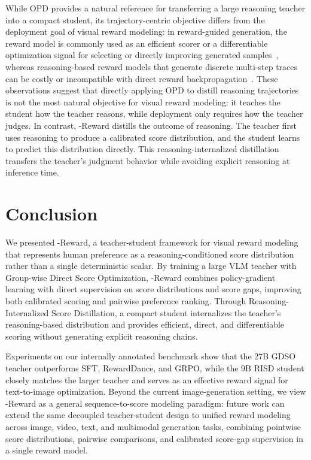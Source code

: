 \documentclass{llmxive}
\providecommand{\mname}{\twemoji[width=0.75em]{zap}-Reward\xspace}
\providecommand{\teaname}{GDSO\xspace}
\providecommand{\stuname}{RISD\xspace}
\begin{document}
While OPD provides a natural reference for transferring a large reasoning teacher into a compact student, its trajectory-centric objective differs from the deployment goal of visual reward modeling: in reward-guided generation, the reward model is commonly used as an efficient scorer or a differentiable optimization signal for selecting or directly improving generated samples~\cite{xu2023imagereward,clark2024directlyfinetuningdiffusionmodels,yang2026joint}, whereas reasoning-based reward models that generate discrete multi-step traces can be costly or incompatible with direct reward backpropagation~\cite{guo2026leveraging}. These observations suggest that directly applying OPD to distill reasoning trajectories is not the most natural objective for visual reward modeling: it teaches the student how the teacher reasons, while deployment only requires how the teacher judges. In contrast, \mname distills the outcome of reasoning. The teacher first uses reasoning to produce a calibrated score distribution, and the student learns to predict this distribution directly. This reasoning-internalized distillation transfers the teacher's judgment behavior while avoiding explicit reasoning at inference time.



\section{Conclusion}

We presented \mname, a teacher-student framework for visual reward modeling that represents human preference as a reasoning-conditioned score distribution rather than a single deterministic scalar. By training a large VLM teacher with Group-wise Direct Score Optimization, \mname combines policy-gradient learning with direct supervision on score distributions and score gaps, improving both calibrated scoring and pairwise preference ranking. Through Reasoning-Internalized Score Distillation, a compact student internalizes the teacher's reasoning-based distribution and provides efficient, direct, and differentiable scoring without generating explicit reasoning chains.

Experiments on our internally annotated benchmark show that the 27B \teaname teacher outperforms SFT, RewardDance, and GRPO, while the 9B \stuname student closely matches the larger teacher and serves as an effective reward signal for text-to-image optimization. Beyond the current image-generation setting, we view \mname as a general sequence-to-score modeling paradigm: future work can extend the same decoupled teacher-student design to unified reward modeling across image, video, text, and multimodal generation tasks, combining pointwise score distributions, pairwise comparisons, and calibrated score-gap supervision in a single reward model.
\end{document}
